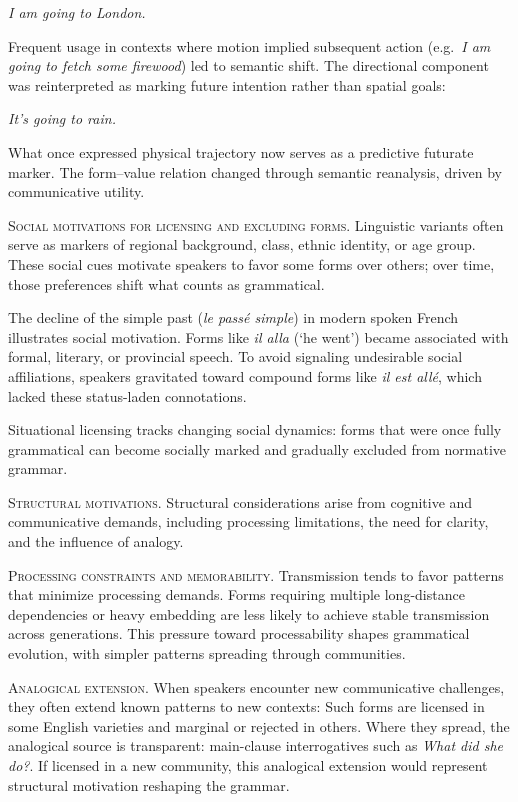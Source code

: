 \documentclass[12pt,letterpaper]{article}
\newcommand{\mention}[1]{\textit{#1}}
\newcommand{\olang}[1]{\textit{#1}}
\begin{document}
\ea
\mention{I am going to London.}
\z

Frequent usage in contexts where motion implied subsequent action (e.g.\, \mention{I am going to fetch some firewood}) led to semantic shift. The directional component was reinterpreted as marking future intention rather than spatial goals:

\ea
\mention{It's going to rain.}
\z

What once expressed physical trajectory now serves as a predictive futurate marker. The form--value relation changed through semantic reanalysis, driven by communicative utility.

\noindent\textsc{Social motivations for licensing and excluding forms.} Linguistic variants often serve as markers of regional background, class, ethnic identity, or age group. These social cues motivate speakers to favor some forms over others; over time, those preferences shift what counts as grammatical.

The decline of the simple past (\olang{le passé simple}) in modern spoken French illustrates social motivation. Forms like \olang{il alla} (`he went') became associated with formal, literary, or provincial speech. To avoid signaling undesirable social affiliations, speakers gravitated toward compound forms like \olang{il est allé}, which lacked these status-laden connotations.

Situational licensing tracks changing social dynamics: forms that were once fully grammatical can become socially marked and gradually excluded from normative grammar.

\noindent\textsc{Structural motivations.} Structural considerations arise from cognitive and communicative demands, including processing limitations, the need for clarity, and the influence of analogy.

\noindent\textsc{Processing constraints and memorability.} Transmission tends to favor patterns that minimize processing demands. Forms requiring multiple long-distance dependencies or heavy embedding are less likely to achieve stable transmission across generations. This pressure toward processability shapes grammatical evolution, with simpler patterns spreading through communities.

\noindent\textsc{Analogical extension.} When speakers encounter new communicative challenges, they often extend known patterns to new contexts:
\ea[\textsuperscript{?}]{\mention{I asked about what did she do.}}
\z
Such forms are licensed in some English varieties and marginal or rejected in others. Where they spread, the analogical source is transparent: main-clause interrogatives such as \mention{What did she do?}. If licensed in a new community, this analogical extension would represent structural motivation reshaping the grammar.
\end{document}
